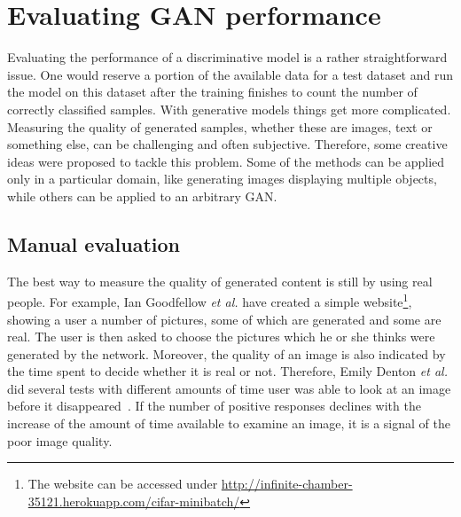 \section{Evaluating GAN performance}
Evaluating the performance of a discriminative model is a rather straightforward issue. One would reserve a portion of the available data  for a test dataset and run the model on this dataset after the training finishes to count the number of correctly classified samples. With generative models things get more complicated. Measuring the quality of generated samples, whether these are images, text or something else, can be challenging and often subjective. Therefore, some creative ideas were proposed to tackle this problem. Some of the methods can be applied only in a particular domain, like generating images displaying multiple objects, while others can be applied to an arbitrary GAN. 
\subsection{Manual evaluation}
The best way to measure the quality of generated content is still by using real people. For example, Ian Goodfellow \textit{et al.} have created a simple website\footnote{The website can be accessed under  \url{http://infinite-chamber-35121.herokuapp.com/cifar-minibatch/}}, showing a user a number of pictures, some of which are generated and some are real. The user is then asked to choose the pictures which he or she thinks were generated by the network. Moreover, the quality of an image is also indicated by the time spent to decide whether it is real or not. Therefore, Emily Denton \textit{et al.} did several tests with different amounts of time user was able to look at an image before it disappeared~\cite{laplacian_gan}. If the number of positive responses declines with the increase of the amount of time available to examine an image, it is a signal of the poor image quality.

